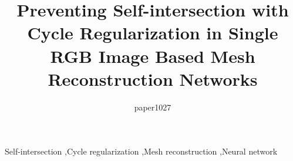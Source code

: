 \documentclass[final,3p]{elsarticle}
\newcommand{\mdf}[1]{\textcolor[rgb]{1.00,0.00,1.00}{#1}}
\begin{document}
\begin{frontmatter}
\title{Preventing Self-intersection with Cycle Regularization in \mdf{Single RGB Image Based} Mesh Reconstruction Networks}

\author{paper1027}




\begin{keyword}
Self-intersection \sep Cycle regularization \sep Mesh reconstruction \sep Neural network
\end{keyword}

\end{frontmatter}

\linenumbers








\end{document}
